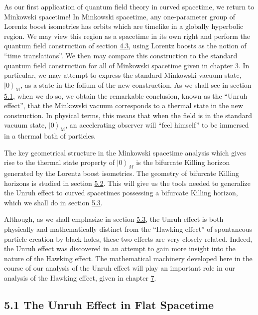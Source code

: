\documentclass[11pt,a4paper]{article}
\providecommand{\ket}[1]{\left\lvert#1\right\rangle}
\begin{document}
As our first application of quantum field theory in curved spacetime, we return to Minkowski spacetime! In Minkowski spacetime, any one-parameter group of Lorentz boost isometries has orbits which are timelike in a globally hyperbolic region. We may view this region as a spacetime in its own right and perform the quantum field construction of section \hyperlink{sec:4.3}{4.3}, using Lorentz boosts as the notion of ``time translations''. We then may compare this construction to the standard quantum field construction for all of Minkowski spacetime given in chapter \hyperlink{sec:3}{3}. In particular, we may attempt to express the standard Minkowski vacuum state, \(\ket{0}_{\mathrm{M}}\), as a state in the folium of the new construction. As we shall see in section \hyperlink{sec:5.1}{5.1}, when we do so, we obtain the remarkable conclusion, known as the ``Unruh effect'', that the Minkowski vacuum corresponds to a thermal state in the new construction. In physical terms, this means that when the field is in the standard vacuum state, \(\ket{0}_{\mathrm{M}}\), an accelerating observer will ``feel himself'' to be immersed in a thermal bath of particles.

The key geometrical structure in the Minkowski spacetime analysis which gives rise to the thermal state property of \(\ket{0}_M\) is the bifurcate Killing horizon generated by the Lorentz boost isometries. The geometry of bifurcate Killing horizons is studied in section \hyperlink{sec:5.2}{5.2}. This will give us the tools needed to generalize the Unruh effect to curved spacetimes possessing a bifurcate Killing horizon, which we shall do in section \hyperlink{sec:5.3}{5.3}.

Although, as we shall emphasize in section \hyperlink{sec:5.3}{5.3}, the Unruh effect is both physically and mathematically distinct from the ``Hawking effect'' of spontaneous particle creation by black holes, these two effects are very closely related. Indeed, the Unruh effect was discovered in an attempt to gain more insight into the nature of the Hawking effect. The mathematical machinery developed here in the course of our analysis of the Unruh effect will play an important role in our analysis of the Hawking effect, given in chapter \hyperlink{sec:7}{7}.

\hypertarget{source-119}{}
\subsection*{5.1 The Unruh Effect in Flat Spacetime}\hypertarget{sec:5.1}{}
\end{document}
